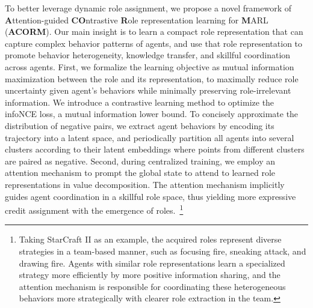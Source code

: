 \documentclass{article} %
\begin{document}
To better leverage dynamic role assignment, we propose a novel framework of \textbf{A}ttention-guided \textbf{CO}ntrastive \textbf{R}ole representation learning for \textbf{M}ARL (\textbf{ACORM}).
Our main insight is to learn a compact role representation that can capture complex behavior patterns of agents, and use that role representation to promote behavior heterogeneity, knowledge transfer, and skillful coordination across agents.
First, we formalize the learning objective as mutual information maximization between the role and its representation, to maximally reduce role uncertainty given agent's behaviors while minimally preserving role-irrelevant information.
We introduce a contrastive learning method to optimize the infoNCE loss, a mutual information lower bound.
To concisely approximate the distribution of negative pairs, we extract agent behaviors by encoding its trajectory into a latent space, and periodically partition all agents into several clusters according to their latent embeddings where points from different clusters are paired as negative.
Second, during centralized training, we employ an attention mechanism to prompt the global state to attend to learned role representations in value decomposition.
The attention mechanism implicitly guides agent coordination in a skillful role space, thus yielding more expressive credit assignment with the emergence of roles.~\footnote{Taking StarCraft II as an example, the acquired roles represent diverse strategies in a team-based manner, such as focusing fire, sneaking attack, and drawing fire.
Agents with similar role representations learn a specialized strategy more efficiently by more positive information sharing, and the attention mechanism is responsible for coordinating these heterogeneous behaviors more strategically with clearer role extraction in the team.}
\end{document}
